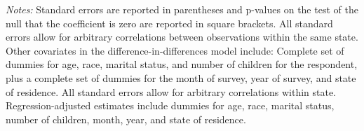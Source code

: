 \begin{table}[htbp]
\centering
\caption{Table 3: Difference-in-Differences OLS and Negative Binomial Estimates \\ Mothers Aged 21--40, 1993--2001 BRFSS}
\begin{minipage}{\linewidth}
\smallskip\footnotesize
\textit{Notes:} Standard errors are reported in parentheses and p-values on the test of the null that the coefficient is zero are reported in square brackets. All standard errors allow for arbitrary correlations between observations within the same state. Other covariates in the difference-in-differences model include: Complete set of dummies for age, race, marital status, and number of children for the respondent, plus a complete set of dummies for the month of survey, year of survey, and state of residence.
 All standard errors allow for arbitrary correlations within state.
 Regression-adjusted estimates include dummies for age, race, marital status,
 number of children, month, year, and state of residence.
\end{minipage}
\end{table}
